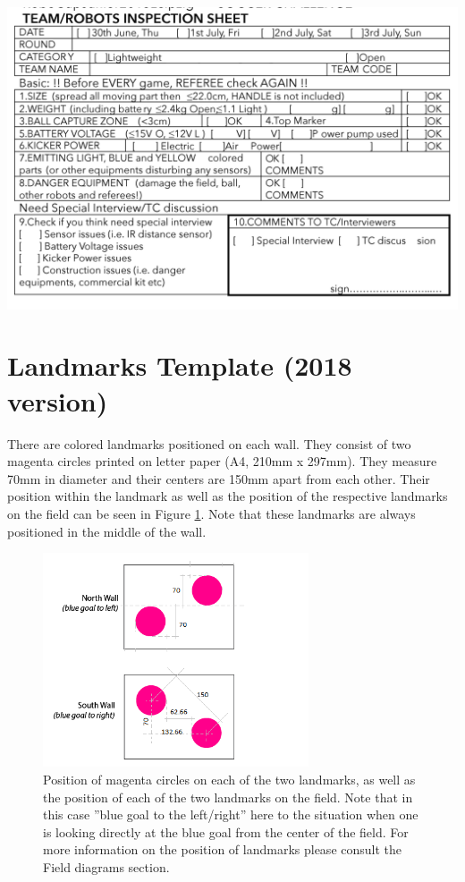 \documentclass{article}
\begin{document}
\includegraphics[width=1\textwidth]{media/image10.png}

\newpage
\section{Landmarks Template (2018 version)\label{landmarks}}

There are colored landmarks positioned on each wall. They consist
of two magenta circles printed on letter paper (A4, 210mm x 297mm). They
measure 70mm in diameter and their centers are 150mm apart from each other.
Their position within the landmark as well as the position of the
respective landmarks on the field can be seen in Figure
\ref{fig:landmarks_blueprint}. Note that these landmarks are always positioned
in the middle of the wall.

\begin{figure}[H]
    \centering
    \includegraphics[width=0.7\textwidth]{media/landmarks_blueprint.png}
    \caption{Position of magenta circles on each of the two landmarks, as well
        as the position of each of the two landmarks on the field. Note that in
        this case ''blue goal to the left/right'' here to the situation when
        one is looking directly at the blue goal from the center of the field.
        For more information on the position of landmarks please consult the
        Field diagrams section.}
    \label{fig:landmarks_blueprint}
\end{figure}
\end{document}

